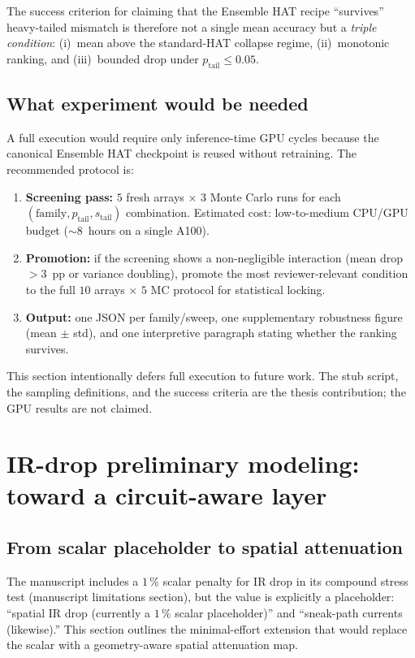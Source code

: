 The success criterion for claiming that the Ensemble HAT recipe ``survives'' heavy-tailed mismatch is therefore not a single mean accuracy but a \emph{triple condition}: (i)~mean above the standard-HAT collapse regime, (ii)~monotonic ranking, and (iii)~bounded drop under $p_{\text{tail}} \le 0.05$.

\subsection{What experiment would be needed}

A full execution would require only inference-time GPU cycles because the canonical Ensemble HAT checkpoint is reused without retraining.  The recommended protocol is:
\begin{enumerate}
    \item \textbf{Screening pass:} $5$ fresh arrays $\times$ $3$ Monte Carlo runs for each $(\text{family}, p_{\text{tail}}, s_{\text{tail}})$ combination.  Estimated cost: low-to-medium CPU/GPU budget ($\sim$8~hours on a single A100).
    \item \textbf{Promotion:} if the screening shows a non-negligible interaction (mean drop $>3$~pp or variance doubling), promote the most reviewer-relevant condition to the full $10$ arrays $\times$ $5$ MC protocol for statistical locking.
    \item \textbf{Output:} one JSON per family/sweep, one supplementary robustness figure (mean $\pm$ std), and one interpretive paragraph stating whether the ranking survives.
\end{enumerate}

This section intentionally defers full execution to future work.  The stub script, the sampling definitions, and the success criteria are the thesis contribution; the GPU results are not claimed.


\section{IR-drop preliminary modeling: toward a circuit-aware layer}
\label{sec:ir-drop}

\subsection{From scalar placeholder to spatial attenuation}

The manuscript includes a $1\,\%$ scalar penalty for IR drop in its compound stress test (manuscript limitations section), but the value is explicitly a placeholder: ``spatial IR drop (currently a $1\,\%$ scalar placeholder)'' and ``sneak-path currents (likewise).''  This section outlines the minimal-effort extension that would replace the scalar with a geometry-aware spatial attenuation map.


